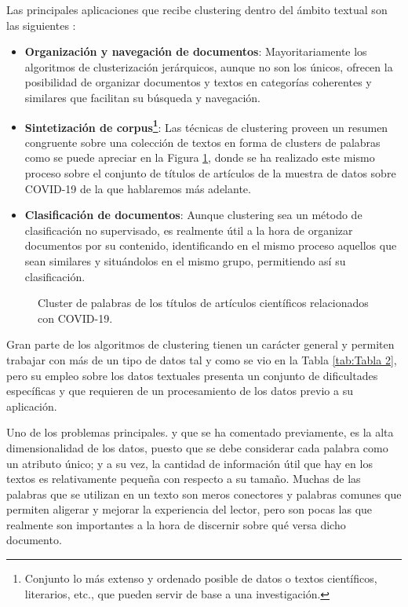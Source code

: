 \documentclass[10pt, a4paper]{article}
\begin{document}
Las principales aplicaciones que recibe clustering dentro del ámbito textual son las siguientes \cite{survey text}:

\begin{itemize}
  \item \textbf{Organización y navegación de documentos}: Mayoritariamente los algoritmos de clusterización jerárquicos, aunque no son los únicos, ofrecen la posibilidad de organizar documentos y textos en categorías coherentes y similares que facilitan su búsqueda y navegación.
  
  \item \textbf{Sintetización de corpus\footnote{Conjunto lo más extenso y ordenado posible de datos o textos científicos, literarios, etc., que pueden servir de base a una investigación.}}: Las técnicas de clustering proveen un resumen congruente sobre una colección de textos en forma de clusters de palabras como se puede apreciar en la Figura \ref{fig:wordcluster}, donde se ha realizado este mismo proceso sobre el conjunto de títulos de artículos de la muestra de datos sobre COVID-19 de la que hablaremos más adelante. 

  \item \textbf{Clasificación de documentos}: Aunque clustering sea un método de clasificación no supervisado, es realmente útil a la hora de organizar documentos por su contenido, identificando en el mismo proceso aquellos que sean similares y situándolos en el mismo grupo, permitiendo así su clasificación. 

\end{itemize}

\begin{figure}[ht]
\caption{Cluster de palabras de los títulos de artículos científicos relacionados con COVID-19.}
\label{fig:wordcluster}
\end{figure}

Gran parte de los algoritmos de clustering tienen un carácter general y permiten trabajar con más de un tipo de datos tal y como se vio en la Tabla \ref{tab:Tabla 2}, pero su empleo sobre los datos textuales presenta un conjunto de dificultades específicas y que requieren de un procesamiento de los datos previo a su aplicación.

Uno de los problemas principales. y que se ha comentado previamente, es la alta dimensionalidad de los datos, puesto que se debe considerar cada palabra como un atributo único; y a su vez, la cantidad de información útil que hay en los textos es relativamente pequeña con respecto a su tamaño. Muchas de las palabras que se utilizan en un texto son meros conectores y palabras comunes que permiten aligerar y mejorar la experiencia del lector, pero son pocas las que realmente son importantes a la hora de discernir sobre qué versa dicho documento.
\end{document}
